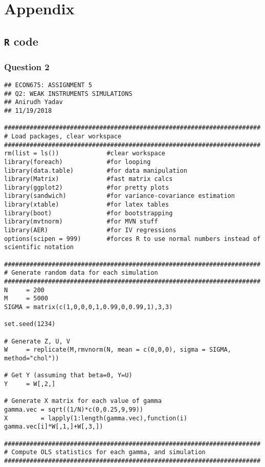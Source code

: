 \documentclass[12pt]{article}
\begin{document}
\newpage

\section{Appendix}
\scriptsize
\subsection{\texttt{R} code}
\subsubsection{Question 2}
\begin{verbatim}
## ECON675: ASSIGNMENT 5
## Q2: WEAK INSTRUMENTS SIMULATIONS
## Anirudh Yadav 
## 11/19/2018

######################################################################
# Load packages, clear workspace
######################################################################
rm(list = ls())             #clear workspace
library(foreach)            #for looping
library(data.table)         #for data manipulation
library(Matrix)             #fast matrix calcs
library(ggplot2)            #for pretty plots
library(sandwich)           #for variance-covariance estimation 
library(xtable)             #for latex tables
library(boot)               #for bootstrapping
library(mvtnorm)            #for MVN stuff
library(AER)                #for IV regressions
options(scipen = 999)       #forces R to use normal numbers instead of scientific notation

######################################################################
# Generate random data for each simulation
######################################################################
N     = 200
M     = 5000
SIGMA = matrix(c(1,0,0,0,1,0.99,0,0.99,1),3,3)

set.seed(1234)

# Generate Z, U, V
W     = replicate(M,rmvnorm(N, mean = c(0,0,0), sigma = SIGMA, method="chol"))

# Get Y (assuming that beta=0, Y=U)
Y     = W[,2,]

# Generate X matrix for each value of gamma
gamma.vec = sqrt((1/N)*c(0,0.25,9,99))
X         = lapply(1:length(gamma.vec),function(i) gamma.vec[i]*W[,1,]+W[,3,])

######################################################################
# Compute OLS statistics for each gamma, and simulation
######################################################################


\end{verbatim}
\end{document}
